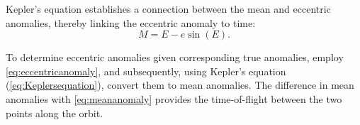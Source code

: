 Kepler's equation establishes a connection between the mean and eccentric anomalies, thereby
linking the eccentric anomaly to time:
\begin{equation}
    M=E-e\sin(E).
    \label{eq:Keplersequation}
\end{equation}

To determine eccentric anomalies given corresponding true anomalies, employ
\cref{eq:eccentricanomaly}, and subsequently, using Kepler's equation (\cref{eq:Keplersequation}),
convert them to mean anomalies. The difference in mean anomalies with \cref{eq:meananomaly}
provides the time-of-flight between the two points along the orbit.
